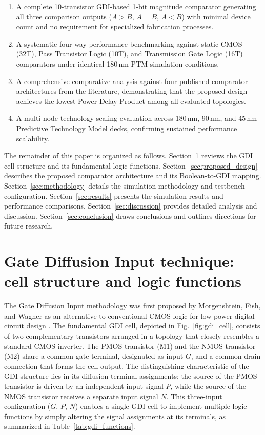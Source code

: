 \documentclass[final,5p,times,twocolumn]{elsarticle}
\begin{document}
\begin{enumerate}
    \item A complete 10-transistor GDI-based 1-bit magnitude comparator generating all three comparison outputs ($A>B$, $A=B$, $A<B$) with minimal device count and no requirement for specialized fabrication processes.
    \item A systematic four-way performance benchmarking against static CMOS (32T), Pass Transistor Logic (10T), and Transmission Gate Logic (16T) comparators under identical 180\,nm PTM simulation conditions.
    \item A comprehensive comparative analysis against four published comparator architectures from the literature, demonstrating that the proposed design achieves the lowest Power-Delay Product among all evaluated topologies.
    \item A multi-node technology scaling evaluation across 180\,nm, 90\,nm, and 45\,nm Predictive Technology Model decks, confirming sustained performance scalability.
\end{enumerate}

The remainder of this paper is organized as follows. Section~\ref{sec:gdi_background} reviews the GDI cell structure and its fundamental logic functions. Section~\ref{sec:proposed_design} describes the proposed comparator architecture and its Boolean-to-GDI mapping. Section~\ref{sec:methodology} details the simulation methodology and testbench configuration. Section~\ref{sec:results} presents the simulation results and performance comparisons. Section~\ref{sec:discussion} provides detailed analysis and discussion. Section~\ref{sec:conclusion} draws conclusions and outlines directions for future research.


\section{Gate Diffusion Input technique: cell structure and logic functions}
\label{sec:gdi_background}

The Gate Diffusion Input methodology was first proposed by Morgenshtein, Fish, and Wagner as an alternative to conventional CMOS logic for low-power digital circuit design \cite{morgenshtein2002}. The fundamental GDI cell, depicted in Fig.~\ref{fig:gdi_cell}, consists of two complementary transistors arranged in a topology that closely resembles a standard CMOS inverter. The PMOS transistor (M1) and the NMOS transistor (M2) share a common gate terminal, designated as input $G$, and a common drain connection that forms the cell output. The distinguishing characteristic of the GDI structure lies in its diffusion terminal assignments: the source of the PMOS transistor is driven by an independent input signal $P$, while the source of the NMOS transistor receives a separate input signal $N$. This three-input configuration ($G$, $P$, $N$) enables a single GDI cell to implement multiple logic functions by simply altering the signal assignments at its terminals, as summarized in Table~\ref{tab:gdi_functions}.
\end{document}
